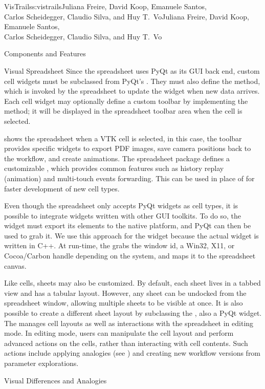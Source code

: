 \begin{aosachaptertoc}{VisTrails}{s:vistrails}{Juliana Freire, David Koop, Emanuele Santos, \\ Carlos Scheidegger, Claudio Silva, and Huy T.\ Vo}{Juliana Freire, David Koop, Emanuele Santos, \\ \hspace*{0.9cm} Carlos Scheidegger, Claudio Silva, and Huy T.\ Vo}
\begin{aosasect1}{Components and Features}
\begin{aosasect2}{Visual Spreadsheet}
Since the spreadsheet uses PyQt as its GUI back end, custom cell
widgets must be subclassed from PyQt's .  They must also
define the  method, which is invoked by the
spreadsheet to update the widget when new data arrives. Each cell
widget may optionally define a custom toolbar by implementing the
 method; it will be displayed in the spreadsheet
toolbar area when the cell is selected.

 shows the spreadsheet when a
VTK cell is selected, in this case, the toolbar provides specific
widgets to export PDF images, save camera positions back to the
workflow, and create animations.  The spreadsheet package defines a
customizable , which provides common features such
as history replay (animation) and multi-touch events forwarding. This
can be used in place of  for faster development of new
cell types.

Even though the spreadsheet only accepts PyQt widgets as cell types,
it is possible to integrate widgets written with other GUI toolkits.
To do so, the widget must export its elements to the native platform,
and PyQt can then be used to grab it. We use this approach for the
 widget because the actual widget is written in C++. At
run-time, the  grabs the window id, a Win32, X11, or
Cocoa/Carbon handle depending on the system, and maps it to the
spreadsheet canvas.

Like cells, sheets may also be customized. By default, each sheet
lives in a tabbed view and has a tabular layout.  However, any sheet
can be undocked from the spreadsheet window, allowing multiple sheets
to be visible at once.  It is also possible to create a different
sheet layout by subclassing the , also a
PyQt widget. The  manages cell layouts as
well as interactions with the spreadsheet in editing mode. In editing
mode, users can manipulate the cell layout and perform advanced
actions on the cells, rather than interacting with cell contents.  Such
actions include applying analogies (see
) and creating new workflow versions
from parameter explorations.

\end{aosasect2}

\begin{aosasect2}{Visual Differences and Analogies}
\label{sec.vistrails.diff}


\end{aosasect2}
\end{aosasect1}
\end{aosachaptertoc}
